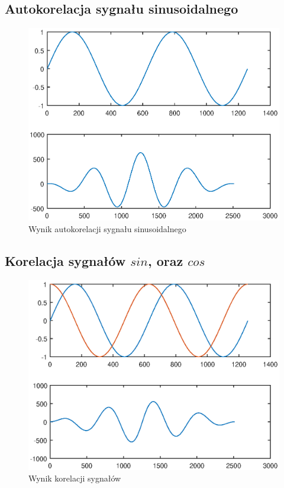 \documentclass[12pt,titlepage]{report}
\begin{document}
\subsection{Autokorelacja sygnału sinusoidalnego}

\begin{figure}[!h]
	\centering
	\includegraphics[scale=0.7]{../cw53_output}
	\caption{Wynik autokorelacji sygnału sinusoidalnego}
\end{figure}

\subsection{Korelacja sygnałów $sin$, oraz $cos$}

\begin{figure}[!h]
	\centering
	\includegraphics[scale=0.7]{../cw54_output}
	\caption{Wynik korelacji sygnałów}
\end{figure}
\end{document}

